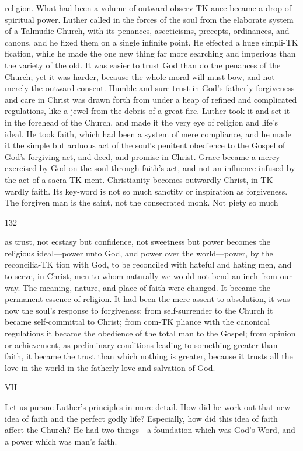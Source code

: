 \documentclass[12pt,a5paper,twoside]{book}
\begin{document}
religion. What had been a volume of outward observ-TK
ance became a drop of spiritual power. Luther called 
in the forces of the soul from the elaborate system of 
a Talmudic Church, with its penances, asceticisms, 
precepts, ordinances, and canons, and he fixed them 
on a single infinite point. He effected a huge simpli-TK
fication, while he made the one new thing far more 
searching and imperious than the variety of the old. 
It was easier to trust God than do the penances of the 
Church; yet it was harder, because the whole moral 
will must bow, and not merely the outward consent. 
Humble and sure trust in God's fatherly forgiveness 
and care in Christ was drawn forth from under a heap 
of refined and complicated regulations, like a jewel 
from the debris of a great fire. Luther took it and 
set it in the forehead of the Church, and made it the 
very eye of religion and life's ideal. He took faith, 
which had been a system of mere compliance, and 
he made it the simple but arduous act of the soul's 
penitent obedience to the Gospel of God's forgiving 
act, and deed, and promise in Christ. Grace became 
a mercy exercised by God on the soul through faith's 
act, and not an influence infused by the act of a sacra-TK
ment. Christianity becomes outwardly Christ, in-TK
wardly faith. Its key-word is not so much sanctity or 
inspiration as forgiveness. The forgiven man is the 
saint, not the consecrated monk. Not piety so much 



132 

as trust, not ecstasy but confidence, not sweetness but 
power becomes the religious ideal---power unto God, 
and power over the world---power, by the reconcilia-TK
tion with God, to be reconciled with hateful and hating 
men, and to serve, in Christ, men to whom naturally 
we would not bend an inch from our way. The 
meaning, nature, and place of faith were changed. It 
became the permanent essence of religion. It had been 
the mere assent to absolution, it was now the soul's 
response to forgiveness; from self-surrender to the 
Church it became self-committal to Christ; from com-TK
pliance with the canonical regulations it became the 
obedience of the total man to the Gospel; from opinion 
or achievement, as preliminary conditions leading to 
something greater than faith, it became the trust than 
which nothing is greater, because it trusts all the love 
in the world in the fatherly love and salvation of God. 

VII 

Let us pursue Luther's principles in more detail. 
How did he work out that new idea of faith and the 
perfect godly life? Especially, how did this idea 
of faith affect the Church? He had two things---a 
foundation which was God's Word, and a power 
which was man's faith. 
\end{document}
